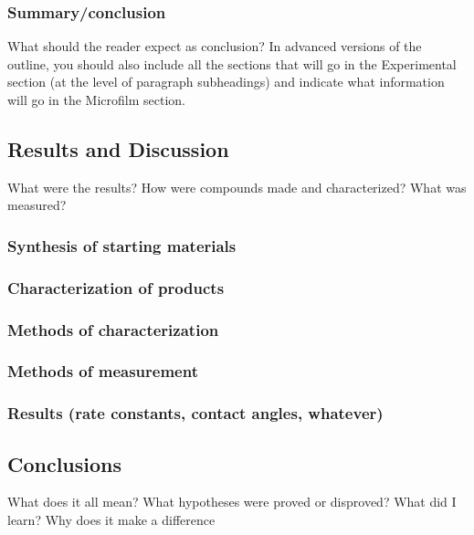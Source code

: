 \documentclass[11pt]{article}
\begin{document}
\subsubsection{Summary/conclusion}
\label{sec:org37d7699}
What should the reader expect as conclusion? In advanced versions of the
outline, you should also include all the sections that will go in the
Experimental section (at the level of paragraph subheadings) and indicate what
information will go in the Microfilm section. 
\vspace*{120px}

\subsection{Results and Discussion}
\label{sec:orgad33888}
What were the results? How were compounds made and characterized? What was
measured? 
\vspace*{120px}

\subsubsection{Synthesis of starting materials}
\label{sec:org390ea94}
\vspace*{120px}

\subsubsection{Characterization of products}
\label{sec:orgb09af94} 
\vspace*{120px}

\subsubsection{Methods of characterization} 
\label{sec:org5b6eff6} 
\vspace*{120px}

\subsubsection{Methods of measurement} 
\label{sec:org587ac4d}
\vspace*{120px}

\subsubsection{Results (rate constants, contact angles, whatever)}
\label{sec:orge6cead3} 
\vspace*{120px}

\subsection{Conclusions}
\label{sec:org0e1fb57} 
What does it all mean? What hypotheses were proved or disproved? What did I
learn? Why does it make a difference 
\vspace*{120px}
\end{document}
